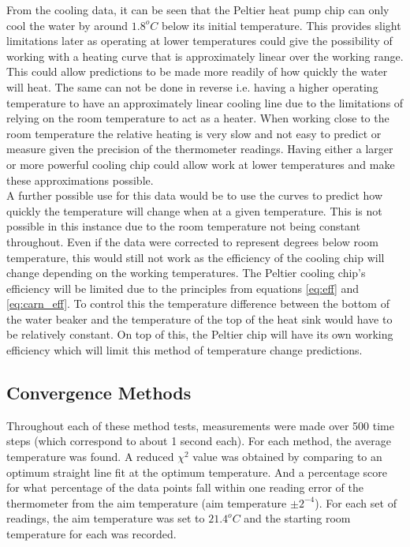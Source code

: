\documentclass[10pt]{article}
\begin{document}
From the cooling data, it can be seen that the Peltier heat pump chip can only cool the water by around $1.8^oC$ below its initial temperature. This provides slight limitations later as operating at lower temperatures could give the possibility of working with a heating curve that is approximately linear over the working range. This could allow predictions to be made more readily of how quickly the water will heat. The same can not be done in reverse i.e. having a higher operating temperature to have an approximately linear cooling line due to the limitations of relying on the room temperature to act as a heater. When working close to the room temperature the relative heating is very slow and not easy to predict or measure given the precision of the thermometer readings. Having either a larger or more powerful cooling chip could allow work at lower temperatures and make these approximations possible. \\

A further possible use for this data would be to use the curves to predict how quickly the temperature will change when at a given temperature. This is not possible in this instance due to the room temperature not being constant throughout. Even if the data were corrected to represent degrees below room temperature, this would still not work as the efficiency of the cooling chip will change depending on the working temperatures. The Peltier cooling chip's efficiency will be limited due to the principles from equations \ref{eq:eff} and \ref{eq:carn_eff}. To control this the temperature difference between the bottom of the water beaker and the temperature of the top of the heat sink would have to be relatively constant. On top of this, the Peltier chip will have its own working efficiency which will limit this method of temperature change predictions.

\subsection*{Convergence Methods}
Throughout each of these method tests, measurements were made over 500 time steps (which correspond to about 1 second each). For each method, the average temperature was found. A reduced $\chi^2$ value was obtained by comparing to an optimum straight line fit at the optimum temperature. And a percentage score for what percentage of the data points fall within one reading error of the thermometer from the aim temperature (aim temperature $\pm 2^{-4}$). For each set of readings, the aim temperature was set to $21.4^oC$ and the starting room temperature for each was recorded.\\
\newpage
\end{document}
